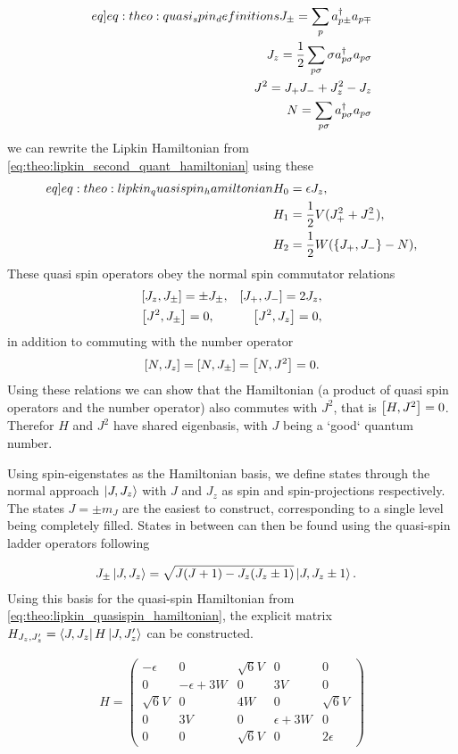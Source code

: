 \begin{align}
    \begin{split}\label[eq]{eq:theo:quasi_spin_definitions}
        J_\pm = \sum_p \crt{p\pm}\ani{p\mp} \\
        J_z = \frac{1}{2}\sum_{p\sigma} \sigma \crt{p\sigma} \ani{p\sigma} \\
        J^2 = J_+ J_- + J_z^2 - J_z \\
        N = \sum_{p\sigma} \crt{p\sigma} \ani{p\sigma}
    \end{split}
\end{align}
we can rewrite the Lipkin Hamiltonian from \cref{eq:theo:lipkin_second_quant_hamiltonian} using these
\begin{align}
    \begin{split} \label[eq]{eq:theo:lipkin_quasispin_hamiltonian}
        H_0 &= \epsilon J_z, \\
        H_1 &= \frac{1}{2}V (J_+^2 + J_-^2), \\
        H_2 &= \frac{1}{2}W ( \set{J_+ , J_- } - N ),
    \end{split}
\end{align}
These quasi spin operators obey the normal spin commutator relations
\begin{align*}
    &\commutator{J_z}{J_\pm} = \pm J_\pm, 
    &\commutator{J_+}{J_-} = 2 J_z, \\
    &\commutator{J^2}{J_\pm} = 0,
    &\commutator{J^2}{J_z} = 0,
\end{align*}
in addition to commuting with the number operator
\begin{align*}
    \commutator{N}{J_z} = \commutator{N}{J_\pm} = \commutator{N}{J^2} = 0.
\end{align*}
Using these relations we can show that the Hamiltonian (a product of quasi spin operators and the number operator) also commutes with  $J^2$, that is $\commutator{H}{J^2}=0$. Therefor $H$ and $J^2$ have shared eigenbasis, with $J$ being a `good` quantum number.

Using spin-eigenstates as the Hamiltonian basis, we define states through the normal approach $\ket{J,J_z}$ with $J$ and $ J_z$ as spin and spin-projections respectively. The states $J = \pm m_J$ are the easiest to construct, corresponding to a single level being completely filled. States in between can then be found using the quasi-spin ladder operators following

\begin{align*}
    J_\pm \ket{J,J_z} &= \sqrt{J(J+1)-J_z (J_z \pm 1)} \ket{J,J_z \pm 1}.
\end{align*}
Using this basis for the quasi-spin Hamiltonian from \cref{eq:theo:lipkin_quasispin_hamiltonian}, the explicit matrix $H_{J_z,J'_z} = \bra{J,J_z} H \ket{J,J_z'}$ can be constructed.

\begin{align}
    H = \begin{pmatrix}
        -\epsilon & 0  & \sqrt{6}V &0 &0 \\
        0 & -\epsilon + 3W & 0 & 3V & 0 \\
        \sqrt{6}V & 0 & 4W & 0 & \sqrt{6}V \\
        0 & 3V & 0 & \epsilon + 3W & 0 \\
        0 & 0 & \sqrt{6}V & 0 & 2\epsilon
    \end{pmatrix}
\end{align}